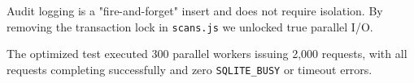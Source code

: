 \documentclass[sigconf]{acmart}
\begin{document}
Audit logging is a "fire-and-forget" insert and does not require isolation. By removing the transaction lock in \texttt{scans.js} we unlocked true parallel I/O. 

The optimized test executed 300 parallel workers issuing 2,000 requests, with all requests completing successfully 
and zero \texttt{SQLITE\_BUSY} or timeout errors.






\end{document}
